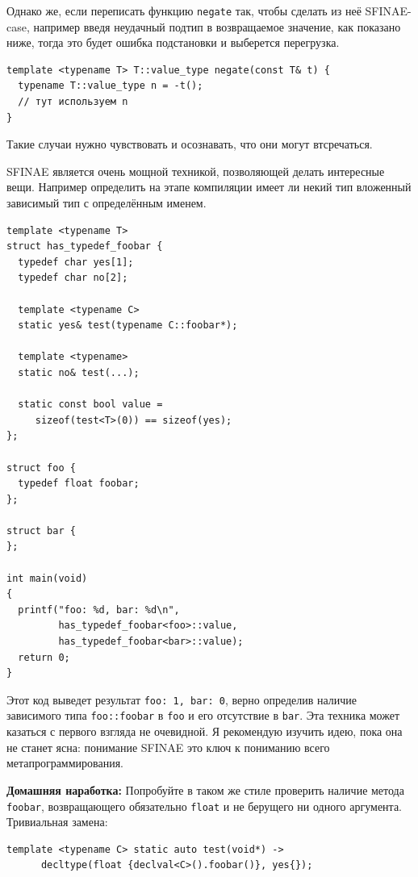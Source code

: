 \documentclass[a4paper,12pt,oneside]{article}
\begin{document}
Однако же, если переписать функцию \lstinline!negate! так, чтобы сделать из неё SFINAE-case, например введя неудачный подтип в возвращаемое значение, как показано ниже, тогда это будет ошибка подстановки и выберется перегрузка.

\begin{lstlisting}
template <typename T> T::value_type negate(const T& t) {
  typename T::value_type n = -t();
  // тут используем n
} 
\end{lstlisting}

Такие случаи нужно чувствовать и осознавать, что они могут втсречаться.

SFINAE является очень мощной техникой, позволяющей делать интересные вещи. Например определить на этапе компиляции имеет ли некий тип вложенный зависимый тип с определённым именем.

\begin{lstlisting}
template <typename T>
struct has_typedef_foobar {
  typedef char yes[1];
  typedef char no[2];
 
  template <typename C>
  static yes& test(typename C::foobar*);
 
  template <typename>
  static no& test(...);
 
  static const bool value = 
     sizeof(test<T>(0)) == sizeof(yes);
};

struct foo {    
  typedef float foobar;
};

struct bar {    
};

int main(void)
{
  printf("foo: %d, bar: %d\n", 
         has_typedef_foobar<foo>::value,
         has_typedef_foobar<bar>::value);
  return 0;
}
\end{lstlisting}

Этот код выведет результат \lstinline!foo: 1, bar: 0!, верно определив наличие зависимого типа \lstinline!foo::foobar! в \lstinline!foo! и его отсутствие в \lstinline!bar!. Эта техника может казаться с первого взгляда не очевидной. Я рекомендую изучить идею, пока она не станет ясна: понимание SFINAE это ключ к пониманию всего метапрограммирования.

\textbf{Домашняя наработка:} Попробуйте в таком же стиле проверить наличие метода \lstinline!foobar!, возвращающего обязательно \lstinline!float! и не берущего ни одного аргумента. Тривиальная замена:

\begin{lstlisting}
template <typename C> static auto test(void*) ->
      decltype(float {declval<C>().foobar()}, yes{});
\end{lstlisting}
\end{document}
